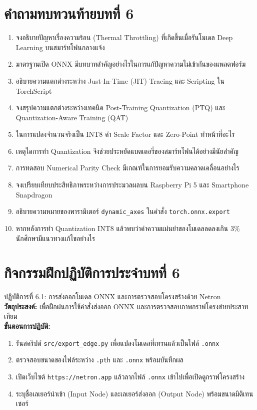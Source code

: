 \section*{คำถามทบทวนท้ายบทที่ 6}
\begin{enumerate}[leftmargin=1.8em, itemsep=4pt]
    \item จงอธิบายปัญหาเรื่องความร้อน (Thermal Throttling) ที่เกิดขึ้นเมื่อรันโมเดล Deep Learning บนสมาร์ทโฟนกลางแจ้ง
    \item มาตรฐานเปิด ONNX มีบทบาทสำคัญอย่างไรในการแก้ปัญหาความไม่เข้ากันของแพลตฟอร์ม
    \item อธิบายความแตกต่างระหว่าง Just-In-Time (JIT) Tracing และ Scripting ใน TorchScript
    \item จงสรุปความแตกต่างระหว่างเทคนิค Post-Training Quantization (PTQ) และ Quantization-Aware Training (QAT)
    \item ในการแปลงจำนวนจริงเป็น INT8 ค่า Scale Factor และ Zero-Point ทำหน้าที่อะไร
    \item เหตุใดการทำ Quantization จึงช่วยประหยัดแบตเตอรี่ของสมาร์ทโฟนได้อย่างมีนัยสำคัญ
    \item การทดสอบ Numerical Parity Check มีเกณฑ์ในการยอมรับความคลาดเคลื่อนอย่างไร
    \item จงเปรียบเทียบประสิทธิภาพระหว่างการประมวลผลบน Raspberry Pi 5 และ Smartphone Snapdragon
    \item อธิบายความหมายของพารามิเตอร์ \texttt{dynamic\_axes} ในคำสั่ง \texttt{torch.onnx.export}
    \item หากหลังการทำ Quantization INT8 แล้วพบว่าค่าความแม่นยำของโมเดลลดลงเกิน 3\% นักศึกษามีแนวทางแก้ไขอย่างไร
\end{enumerate}

\section*{กิจกรรมฝึกปฏิบัติการประจำบทที่ 6}
\begin{nocodebox}{ปฏิบัติการที่ 6.1: การส่งออกโมเดล ONNX และการตรวจสอบโครงสร้างด้วย Netron}
\textbf{วัตถุประสงค์:} เพื่อฝึกฝนการใช้คำสั่งส่งออก ONNX และการตรวจสอบภาพกราฟโครงข่ายประสาทเทียม\\
\textbf{ขั้นตอนการปฏิบัติ:}
\begin{enumerate}[leftmargin=1.4em, itemsep=2pt]
    \item รันสคริปต์ \texttt{src/export\_edge.py} เพื่อแปลงโมเดลที่เทรนแล้วเป็นไฟล์ \texttt{.onnx}
    \item ตรวจสอบขนาดของไฟล์ระหว่าง \texttt{.pth} และ \texttt{.onnx} พร้อมบันทึกผล
    \item เปิดเว็บไซต์ \texttt{https://netron.app} แล้วลากไฟล์ \texttt{.onnx} เข้าไปเพื่อเปิดดูกราฟโครงสร้าง
    \item ระบุชื่อเลเยอร์นำเข้า (Input Node) และเลเยอร์ส่งออก (Output Node) พร้อมขนาดมิติเทนเซอร์
\end{enumerate}
\end{nocodebox}
